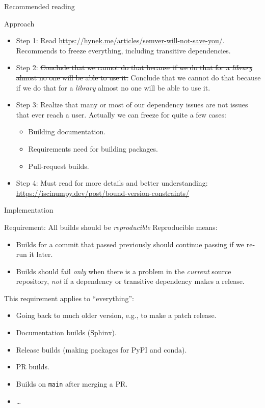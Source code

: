 \documentclass[english,aspectratio=1610,smaller]{beamer}
\begin{document}
\begin{frame}{Recommended reading}
  \begin{block}{Approach}
    \begin{itemize}
      \item Step 1: Read \url{https://hynek.me/articles/semver-will-not-save-you/}. Recommends to freeze everything, including transitive dependencies.
      \item Step 2: 
        {\sout{Conclude that we cannot do that because if we do that for a \emph{library} almost no one will be able to use it.}}
        {Conclude that we cannot do that because if we do that for a \emph{library} almost no one will be able to use it.}
      \item<2-> Step 3: Realize that many or most of our dependency issues are not issues that ever reach a user.
        Actually we can freeze for quite a few cases:
        \begin{itemize}
          \item Building documentation.
          \item Requirements need for building packages.
          \item Pull-request builds.
        \end{itemize}
      \item<2-> Step 4: Must read for more details and better understanding:
        \url{https://iscinumpy.dev/post/bound-version-constraints/}
    \end{itemize}
  \end{block}
\end{frame}


\begin{frame}{Implementation}
  \begin{block}{Requirement: All builds should be \emph{reproducible}}
    Reproducible means:
    \begin{itemize}
      \item Builds for a commit that passed previously should continue passing if we re-run it later.
      \item Builds should fail \emph{only} when there is a problem in the \emph{current} source repository, \emph{not} if a dependency or transitive dependency makes a release.
    \end{itemize}
    This requirement applies to ``everything'':
    \begin{itemize}
      \item Going back to much older version, e.g., to make a patch release.
      \item Documentation builds (Sphinx).
      \item Release builds (making packages for PyPI and conda).
      \item PR builds.
      \item Builds on \texttt{main} after merging a PR.
      \item \dots
    \end{itemize}
  \end{block}
\end{frame}
\end{document}
